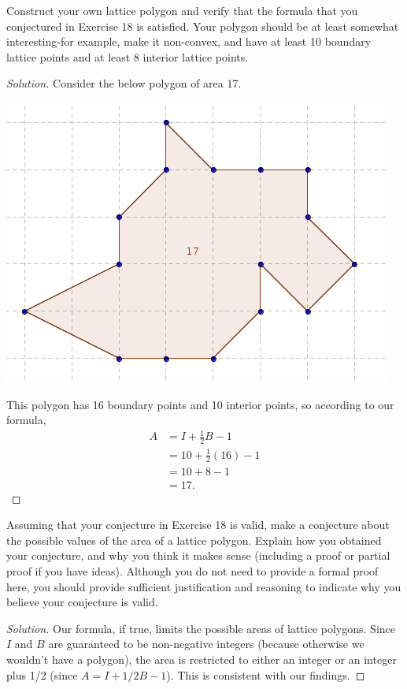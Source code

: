\documentclass[12pt]{article}
\newenvironment{exercise}[2][Exercise]{\begin{trivlist}
        \item[\hskip \labelsep {\bfseries #1}\hskip \labelsep {\bfseries #2.}]}{\end{trivlist}}
\newenvironment{solution}
        {\begin{proof}[Solution]}
                    {\end{proof}}
\begin{document}
\begin{exercise}{19}
    Construct your own lattice polygon and verify that the formula that you conjectured in Exercise 18 is satisfied. Your polygon should be at least somewhat interesting-for example, make it non-convex, and have at least 10 boundary lattice points and at least 8 interior lattice points.
    \begin{solution}
        Consider the below polygon of area 17.
        \begin{center}
            \includegraphics[width=.45\linewidth]{19}
        \end{center}
        This polygon has 16 boundary points and 10 interior points, so according to our formula,
        \begin{align*}
            A &= I + \frac{1}{2} B - 1\\
            &= 10 + \frac{1}{2} ( 16 ) - 1\\
            &= 10 + 8 - 1\\
            &= 17.
        \end{align*}
    \end{solution}
\end{exercise}

\begin{exercise}{20}
    Assuming that your conjecture in Exercise 18 is valid, make a conjecture about the possible values of the area of a lattice polygon. Explain how you obtained your conjecture, and why you think it makes sense (including a proof or partial proof if you have ideas). Although you do not need to provide a formal proof here, you should provide sufficient justification and reasoning to indicate why you believe your conjecture is valid.
    \begin{solution}
        Our formula, if true, limits the possible areas of lattice polygons. Since \( I \) and \( B \) are guaranteed to be non-negative integers (because otherwise we wouldn't have a polygon), the area is restricted to either an integer or an integer plus 1/2 (since \( A = I + 1/2B -1 \)). This is consistent with our findings.
    \end{solution}
\end{exercise}
\end{document}
